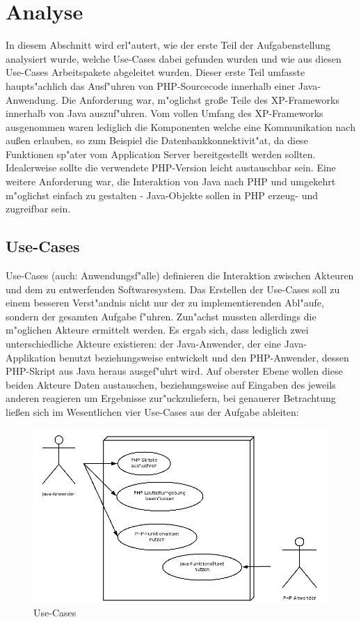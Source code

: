 \section{Analyse}
\label{sec:chap1:ana}

In diesem Abschnitt wird erl"autert, wie der erste Teil der Aufgabenstellung analysiert wurde, welche Use-Cases dabei gefunden 
wurden und wie aus diesen Use-Cases Arbeitspakete abgeleitet wurden. Dieser erste Teil umfasste haupts"achlich das Ausf"uhren 
von PHP-Sourcecode innerhalb einer Java-Anwendung. 
Die Anforderung war, m"oglichst gro\ss e Teile des XP-Frameworks innerhalb von Java auszuf"uhren.
Vom vollen Umfang des XP-Frameworks ausgenommen waren lediglich die Komponenten welche eine Kommunikation
nach au\ss en erlauben, so zum Beispiel die Datenbankkonnektivit"at, da diese Funktionen sp"ater vom Application Server
bereitgestellt werden sollten. Idealerweise sollte die verwendete PHP-Version leicht austauschbar sein. Eine weitere
Anforderung war, die Interaktion von Java nach PHP und umgekehrt m"oglichst einfach zu gestalten - Java-Objekte sollen
in PHP erzeug- und zugreifbar sein.

\subsection{Use-Cases}
\label{sec:chap1:ana:uc}

Use-Cases (auch: Anwendungsf"alle) definieren die Interaktion zwischen Akteuren und dem zu entwerfenden Softwaresystem.
Das Erstellen der Use-Cases soll zu einem besseren Verst"andnis nicht nur der zu implementierenden Abl"aufe, sondern
der gesamten Aufgabe f"uhren. Zun"achst mussten allerdings die m"oglichen Akteure ermittelt
werden. Es ergab sich, dass lediglich zwei unterschiedliche Akteure existieren: der Java-Anwender, der eine Java-Applikation
benutzt beziehungsweise entwickelt und den PHP-Anwender, dessen PHP-Skript aus Java heraus ausgef"uhrt wird. Auf oberster Ebene
wollen diese beiden Akteure Daten austauschen, beziehungsweise auf Eingaben des jeweils anderen reagieren um Ergebnisse zur"uckzuliefern,
bei genauerer Betrachtung lie\ss en sich im Wesentlichen vier Use-Cases aus der Aufgabe ableiten:

\begin{figure}[h]
\includegraphics[width=\textwidth]{chap1/img/usecases.png}
\caption{Use-Cases}
\label{fig:usecases}
\end{figure}

